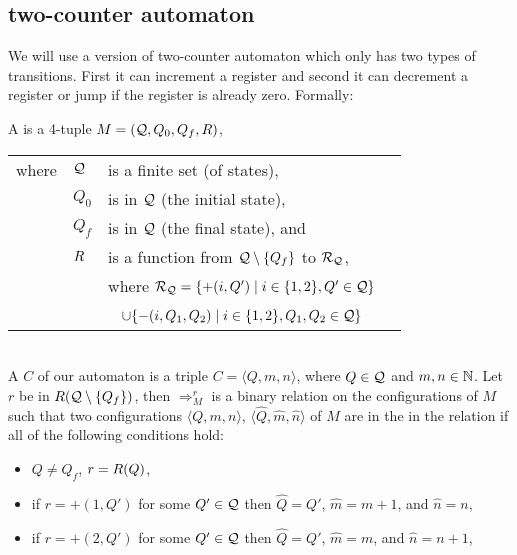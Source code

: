 \subsection{two-counter automaton} %
We will use a version of two-counter automaton which only has two types of transitions. First it can increment a register and second it can decrement a register or jump if the register is already zero. Formally:
\begin{definition}\label{def.2.24}
	A  is a 4-tuple $M=(\mathcal{Q},Q_0,Q_f,R)$,
	\begin{tabular}{llp{0.78\linewidth}}
		where & $\mathcal{Q}$ & is a finite set (of states),                                                                           \\
& $Q_0$        & is in $\mathcal{Q}$ (the initial state),                                                                \\
& $Q_f$        & is in $\mathcal{Q}$ (the final state), and                                                              \\
& $R$  & is a function from $\mathcal{Q}\setminus\{Q_f\}$ to $\mathcal{R}_\autStates$,                           \\
&              & where $\mathcal{R}_{\mathcal{Q}}=\{+(i,Q')\mid i\in\{1,2\},Q'\in\mathcal{Q}\}$                             \\
&              & ~ \hphantom{where $\mathcal{R}_\autStates$}$\cup\{-(i,Q_1,Q_2)\mid i\in\{1,2\},Q_1,Q_2\in\mathcal{Q}\}$ 
	\end{tabular}\\
	A  $C$ of our automaton is a triple $C=\langle Q,m,n\rangle$, where $Q\in\mathcal{Q}$ and $m,n\in\mathbb{N}$.
	Let $r$ be in $R(\mathcal{Q}\setminus\{Q_f\})$, then $\Rightarrow^r_M$ is a binary relation on the configurations of $M$ such that two configurations $\langle Q,m,n\rangle$, $\langle \widehat{Q},\widehat{m},\widehat{n}\rangle$ of $M$ are in the in the relation if all of the following conditions hold:
	\begin{itemize}
		\item $Q\neq Q_f$, $r=R(Q)$,
		\item if $r=+(1,Q')$ for some $Q'\in \mathcal{Q}$ then $\widehat{Q}=Q'$, $\widehat{m}=m+1$, and $\widehat{n}=n$,
		\item if $r=+(2,Q')$ for some $Q'\in \mathcal{Q}$ then $\widehat{Q}=Q'$, $\widehat{m}=m$, and $\widehat{n}=n+1$,

\end{itemize}
\end{definition}
